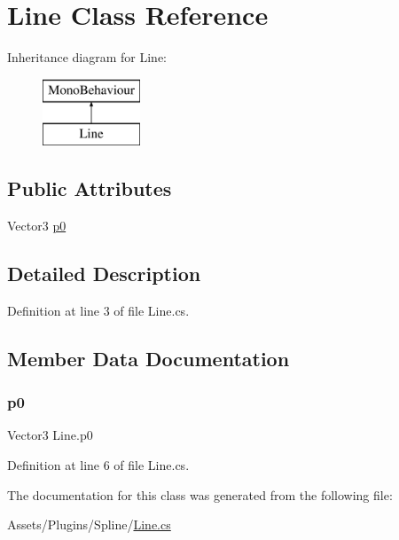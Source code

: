 \hypertarget{class_line}{}\section{Line Class Reference}
\label{class_line}
Inheritance diagram for Line\+:\begin{figure}[H]
\begin{center}
\leavevmode
\includegraphics[height=2.000000cm]{class_line}
\end{center}
\end{figure}
\subsection*{Public Attributes}
\begin{DoxyCompactItemize}
\item 
Vector3 \mbox{\hyperlink{class_line_a20d5ecabee2113e42017734b748b485d}{p0}}
\end{DoxyCompactItemize}


\subsection{Detailed Description}


Definition at line 3 of file Line.\+cs.



\subsection{Member Data Documentation}
\mbox{\label{class_line_a20d5ecabee2113e42017734b748b485d}} 
\subsubsection{\texorpdfstring{p0}{p0}}
{\footnotesize\ttfamily Vector3 Line.\+p0}



Definition at line 6 of file Line.\+cs.



The documentation for this class was generated from the following file\+:\begin{DoxyCompactItemize}
\item 
Assets/\+Plugins/\+Spline/\mbox{\hyperlink{_line_8cs}{Line.\+cs}}\end{DoxyCompactItemize}
